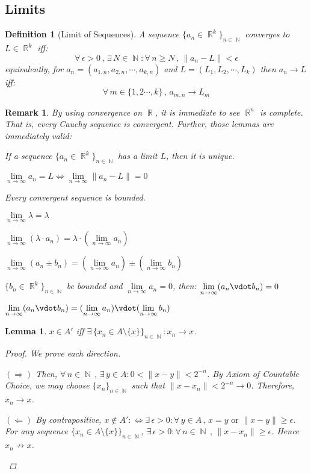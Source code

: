 \documentclass[12pt]{article}
\let\RA\Rightarrow
\let\LA\Leftarrow
\let\LR\Leftrightarrow
\let\ee\epsilon
\newcommand{\Forall}[1]{\forall\,{#1}\,,\,}
\newcommand{\Exist}[1]{\exists\,{#1}:}
\DeclareMathOperator{\R}{\mathbb{R}}
\DeclareMathOperator{\N}{\mathbb{N}}
\newcommand{\seq}[2]{\{{#1}\}_{#2\in\N}}
\newtheorem{definition}[theorem]{Definition}
\newtheorem{lemma}[theorem]{Lemma}
\newtheorem{remark}[theorem]{Remark}
\begin{document}
\pagebreak

\subsection{Limits}

\begin{definition}[Limit of Sequences]
  \label{seq_limit}
  A sequence $\seq{a_n\in\R^k}{n}$ converges to $L\in\R^k$ iff: $$\Forall{\ee>0}\Exist{N\in\N}\Forall{n\geq N}\|a_n-L\|<\ee$$ equivalently, for $a_n=(a_{1,n},a_{2,n},\cdots,a_{k,n})$ and $L=(L_1,L_2,\cdots,L_k)$ then $a_n\to L$ iff: $$\Forall{m\in\{1,2\cdots,k\}}a_{m,n}\to L_m$$
\end{definition}

\begin{remark}
  \label{seq_lemmas}
  By using convergence on $\R$, it is immediate to see $\R^n$ is complete. That is, every Cauchy sequence is convergent. Further, those lemmas are immediately valid:
  \begin{compactenum}[(a)]
    \item If a sequence $\seq{a_n\in \R^k}{n}$ has a limit $L$, then it is unique.
    \item $\lim\limits_{n\to\infty} a_n = L \LR \lim\limits_{n\to\infty} \|a_n-L\|=0$
    \item Every convergent sequence is bounded.
    \item $\lim\limits_{n\to\infty} \lambda=\lambda$
    \item $\lim\limits_{n\to\infty} (\lambda\cdot a_n)=\lambda\cdot (\lim\limits_{n\to\infty} a_n)$
    \item $\lim\limits_{n\to\infty} (a_n\pm b_n)=(\lim\limits_{n\to\infty} a_n)\pm (\lim\limits_{n\to\infty} b_n)$ 
    \item $\seq{b_n\in\R^k}{n}$ be bounded and $\lim\limits_{n\to\infty} a_n =0$, then: $\lim\limits_{n\to\infty}(a_n\vdot b_n)=0$
    \item $\lim\limits_{n\to\infty} (a_n\vdot b_n)=(\lim\limits_{n\to\infty} a_n)\vdot (\lim\limits_{n\to\infty} b_n)$
  \end{compactenum}
\end{remark}

\begin{lemma}
  \label{limit_point}
  $x\in A'$ iff $\Exist{\seq{x_n\in A\setminus\{x\}}{n}}x_n\to x$.
  \begin{proof}
    We prove each direction.
    \begin{compactitem}
      \item[$(\RA)$] Then, $\Forall{n\in\N}\Exist{y\in A}0<\|x-y\|<2^{-n}$. By Axiom of Countable Choice, we may choose $\seq{x_n}{n}$ such that $\|x-x_n\|<2^{-n}\to 0$. Therefore, $x_n\to x$.
      \item[$(\LA)$] By contrapositive, $x\notin A':\LR\Exist{\ee>0}\Forall{y\in A}x=y\text{ or }\|x-y\|\geq\ee$. For any sequence $\seq{x_n\in A\setminus\{x\}}{n}$, $\Exist{\ee>0}\Forall{n\in\N}\|x-x_n\|\geq \ee$. Hence $x_n\not\to x$.
    \end{compactitem}
  \end{proof}
\end{lemma}
\end{document}
